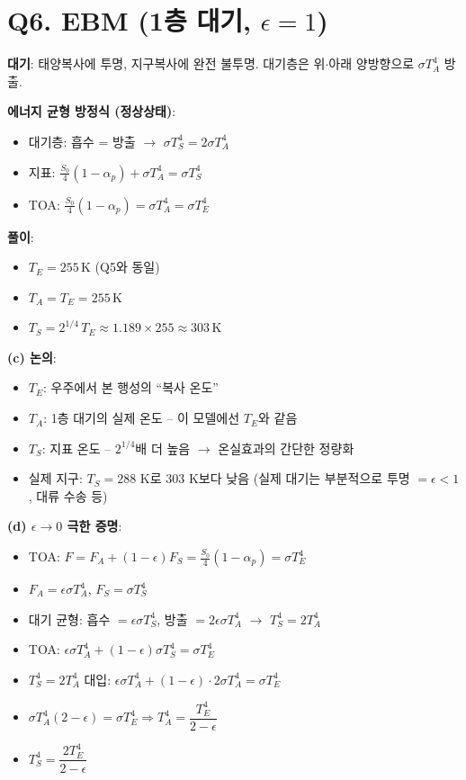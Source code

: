 \documentclass[11pt,a4paper]{article}
\begin{document}
\section*{Q6. EBM (1층 대기, $\epsilon=1$)}

\textbf{대기}: 태양복사에 투명, 지구복사에 완전 불투명. 대기층은 위$\cdot$아래 양방향으로 $\sigma T_A^4$ 방출.

\textbf{에너지 균형 방정식 (정상상태)}:
\begin{itemize}
    \item 대기층: 흡수 = 방출 $\to$ $\sigma T_S^4 = 2\sigma T_A^4$
    \item 지표: $\frac{S_0}{4}(1-\alpha_p) + \sigma T_A^4 = \sigma T_S^4$
    \item TOA: $\frac{S_0}{4}(1-\alpha_p) = \sigma T_A^4 = \sigma T_E^4$
\end{itemize}

\textbf{풀이}:
\begin{itemize}
    \item $T_E = 255\,\mathrm{K}$ (Q5와 동일)
    \item $T_A = T_E = 255\,\mathrm{K}$
    \item $T_S = 2^{1/4}\,T_E \approx 1.189 \times 255 \approx \boxed{303\,\mathrm{K}}$
\end{itemize}

\textbf{(c) 논의}:
\begin{itemize}
    \item $T_E$: 우주에서 본 행성의 ``복사 온도''
    \item $T_A$: 1층 대기의 실제 온도 -- 이 모델에선 $T_E$와 같음
    \item $T_S$: 지표 온도 -- $2^{1/4}$배 더 높음 $\to$ 온실효과의 간단한 정량화
    \item 실제 지구: $T_S=288$ K로 303 K보다 낮음 (실제 대기는 부분적으로 투명 $= \epsilon<1$, 대류 수송 등)
\end{itemize}

\textbf{(d) $\epsilon \to 0$ 극한 증명}:
\begin{itemize}
    \item TOA: $F = F_A + (1-\epsilon)F_S = \tfrac{S_0}{4}(1-\alpha_p) = \sigma T_E^4$
    \item $F_A = \epsilon \sigma T_A^4$, $F_S = \sigma T_S^4$
    \item 대기 균형: 흡수 $= \epsilon \sigma T_S^4$, 방출 $= 2\epsilon \sigma T_A^4$ $\to$ $T_S^4 = 2 T_A^4$
    \item TOA: $\epsilon \sigma T_A^4 + (1-\epsilon)\sigma T_S^4 = \sigma T_E^4$
    \item $T_S^4 = 2T_A^4$ 대입: $\epsilon \sigma T_A^4 + (1-\epsilon)\cdot 2\sigma T_A^4 = \sigma T_E^4$
    \item $\sigma T_A^4 (2-\epsilon) = \sigma T_E^4 \Rightarrow T_A^4 = \dfrac{T_E^4}{2-\epsilon}$
    \item $T_S^4 = \dfrac{2 T_E^4}{2-\epsilon}$
\end{itemize}
\end{document}
